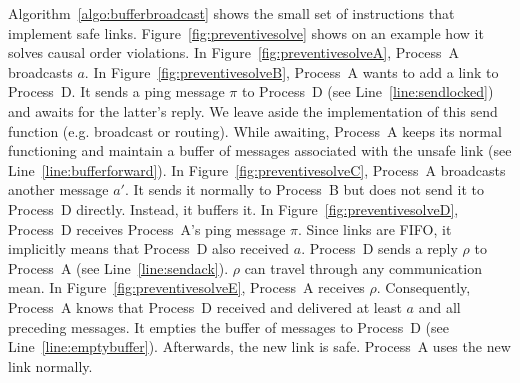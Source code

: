 Algorithm~\ref{algo:bufferbroadcast} shows the small set of instructions that
implement safe links.  Figure~\ref{fig:preventivesolve} shows on an example how
it solves causal order violations. In Figure~\ref{fig:preventivesolveA},
Process~A broadcasts $a$.  In Figure~\ref{fig:preventivesolveB}, Process~A wants
to add a link to Process~D. It sends a ping message $\pi$ to Process~D (see
Line~\ref{line:sendlocked}) and awaits for the latter's reply.  We leave aside
the implementation of this send function (e.g. broadcast or routing).  While
awaiting, Process~A keeps its normal functioning and maintain a buffer of
messages associated with the unsafe link (see Line~\ref{line:bufferforward}). In
Figure~\ref{fig:preventivesolveC}, Process~A broadcasts another message $a'$. It
sends it normally to Process~B but does not send it to Process~D
directly. Instead, it buffers it. In Figure~\ref{fig:preventivesolveD},
Process~D receives Process~A's ping message $\pi$. Since links are FIFO, it
implicitly means that Process~D also received $a$. Process~D sends a reply
$\rho$ to Process~A (see Line~\ref{line:sendack}). $\rho$ can travel through any
communication mean. In Figure~\ref{fig:preventivesolveE}, Process~A receives
$\rho$. Consequently, Process~A knows that Process~D received and delivered at
least $a$ and all preceding messages. It empties the buffer of messages to
Process~D (see Line~\ref{line:emptybuffer}). Afterwards, the new link is
safe. Process~A uses the new link normally.



